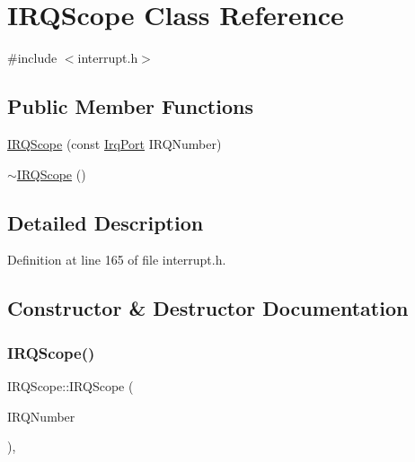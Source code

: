 \hypertarget{class_i_r_q_scope}{}\section{I\+R\+Q\+Scope Class Reference}
\label{class_i_r_q_scope}


{\ttfamily \#include $<$interrupt.\+h$>$}

\subsection*{Public Member Functions}
\begin{DoxyCompactItemize}
\item 
\hyperlink{class_i_r_q_scope_a26171d82283561e9430bc54390879bfc}{I\+R\+Q\+Scope} (const \hyperlink{struct_irq_port}{Irq\+Port} I\+R\+Q\+Number)
\item 
\hyperlink{class_i_r_q_scope_ad1706a38c6c745a241184565c97aff12}{$\sim$\+I\+R\+Q\+Scope} ()
\end{DoxyCompactItemize}


\subsection{Detailed Description}


Definition at line 165 of file interrupt.\+h.



\subsection{Constructor \& Destructor Documentation}
\mbox{\label{class_i_r_q_scope_a26171d82283561e9430bc54390879bfc}} 
\subsubsection{\texorpdfstring{I\+R\+Q\+Scope()}{IRQScope()}}
{\footnotesize\ttfamily I\+R\+Q\+Scope\+::\+I\+R\+Q\+Scope (\begin{DoxyParamCaption}\item[{const \hyperlink{struct_irq_port}{Irq\+Port}}]{I\+R\+Q\+Number }\end{DoxyParamCaption})\hspace{0.3cm}{\ttfamily [inline]}, {\ttfamily [explicit]}}



